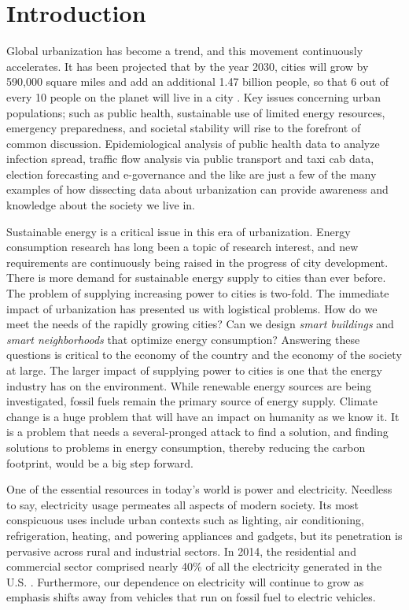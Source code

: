\section{Introduction}
Global urbanization has become a trend, and this movement continuously accelerates. 
It has been projected that by the year 2030, cities will grow by 590,000 square miles and add an additional 1.47 billion people, so that 6 out of every 10 people on the planet will live in a city \cite{seto2011meta}. Key issues concerning urban populations; such as public health, sustainable use of limited energy resources, emergency preparedness, and societal stability will rise to the forefront of common discussion. Epidemiological analysis of public health data to analyze infection spread, traffic flow analysis via public transport and taxi cab data, election forecasting and e-governance and the like are just a few of the many examples of how dissecting data about urbanization can provide awareness and knowledge about the society we live in. 

Sustainable energy is a critical issue in this era of urbanization. 
Energy consumption research has long been a topic of research interest, and 
new requirements are continuously being raised in the progress of city development.  
There is more demand for sustainable energy supply to cities than ever before. The problem of supplying increasing power to cities is two-fold. The immediate impact of urbanization has presented us with logistical problems. How do we meet the needs of the rapidly growing cities? Can we design \emph{smart buildings} and \emph{smart neighborhoods} that optimize energy consumption? Answering these questions is critical to the economy of the country and the economy of the society at large. The larger impact of supplying power to cities is one that the energy industry has on the environment. While renewable energy sources are being investigated, fossil fuels remain the primary source of energy supply. 
  Climate change is a huge problem that will have an impact on humanity as we know it. 
 It is a problem that needs a several-pronged attack to find a solution, and finding solutions to problems in energy consumption, thereby reducing the carbon footprint, would be a big step forward.
 
One of the essential resources in today's world is power and electricity. Needless to say, electricity usage permeates all aspects of modern society.
Its most conspicuous
uses include urban contexts such as
lighting, air conditioning, refrigeration, heating, and powering
appliances and gadgets, but its penetration is pervasive across rural
and industrial sectors.
In 2014, the residential and commercial sector
comprised nearly 40\% of all the electricity generated in the U.S. \cite{book2014us}.
Furthermore, our dependence on electricity will continue to grow
as emphasis shifts away from vehicles that run on fossil fuel to electric
vehicles.


